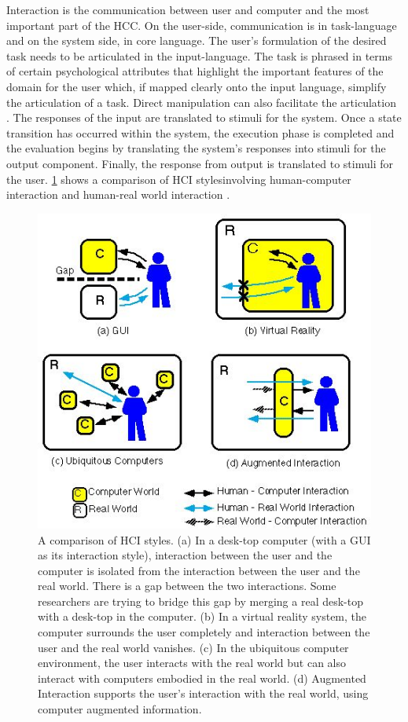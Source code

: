 Interaction is the communication between user and computer and the most important part of the HCC. On the user-side, communication is in task-language and on the system side, in core language. The user's formulation of the desired task needs to be articulated in the input-language. The task is phrased in terms of certain psychological attributes that highlight the important features of the domain for the user which, if mapped clearly onto the input language, simplify the articulation of a task. Direct manipulation can also facilitate the articulation \cite{Dix2009}.
The responses of the input are translated to stimuli for the system. Once a state transition has occurred within the system, the execution phase is completed and the evaluation begins by translating the system's responses into stimuli for the output component. Finally, the response from output is translated to stimuli for the user. \figurename{\ref{fig:2-bg:HCI}} shows a comparison of HCI stylesinvolving human-computer interaction and human-real world interaction \cite{Rekimoto1995}.
\begin{figure}
	\centering
	\includegraphics[width=0.6\linewidth]{figures/2-bg/HCI}
	\caption{ A comparison of HCI styles. (a) In a desk-top computer (with a GUI as its interaction style), interaction between the user and the computer is isolated from the interaction between the user and the real world. There is a gap between the two interactions. Some researchers are trying to bridge this gap by merging a real desk-top with a desk-top in the computer. (b) In a virtual reality system, the computer surrounds the user completely and interaction between the user and the real world vanishes. (c) In the ubiquitous computer environment, the user interacts with the real world but can also interact with computers embodied in the real world. (d) Augmented Interaction supports the user's interaction with the real world, using computer augmented information. }
	\label{fig:2-bg:HCI}
\end{figure}

